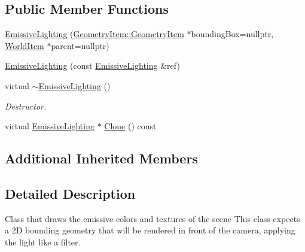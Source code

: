 \subsection*{Public Member Functions}
\begin{DoxyCompactItemize}
\item 
\mbox{\hyperlink{class_geometry_engine_1_1_geometry_world_item_1_1_geometry_light_1_1_emissive_lighting_a50dbde1e7a06662e05bd9732b040b845}{Emissive\+Lighting}} (\mbox{\hyperlink{class_geometry_engine_1_1_geometry_world_item_1_1_geometry_item_1_1_geometry_item}{Geometry\+Item\+::\+Geometry\+Item}} $\ast$bounding\+Box=nullptr, \mbox{\hyperlink{class_geometry_engine_1_1_geometry_world_item_1_1_world_item}{World\+Item}} $\ast$parent=nullptr)
\item 
\mbox{\hyperlink{class_geometry_engine_1_1_geometry_world_item_1_1_geometry_light_1_1_emissive_lighting_aac76201e50ff6a2a62ec84225c7bffaa}{Emissive\+Lighting}} (const \mbox{\hyperlink{class_geometry_engine_1_1_geometry_world_item_1_1_geometry_light_1_1_emissive_lighting}{Emissive\+Lighting}} \&ref)
\item 
\mbox{\label{class_geometry_engine_1_1_geometry_world_item_1_1_geometry_light_1_1_emissive_lighting_a91b7faede57c7eb04237b5296ef33db9}} 
virtual \mbox{\hyperlink{class_geometry_engine_1_1_geometry_world_item_1_1_geometry_light_1_1_emissive_lighting_a91b7faede57c7eb04237b5296ef33db9}{$\sim$\+Emissive\+Lighting}} ()
\begin{DoxyCompactList}\small\item\em Destructor. \end{DoxyCompactList}\item 
virtual \mbox{\hyperlink{class_geometry_engine_1_1_geometry_world_item_1_1_geometry_light_1_1_emissive_lighting}{Emissive\+Lighting}} $\ast$ \mbox{\hyperlink{class_geometry_engine_1_1_geometry_world_item_1_1_geometry_light_1_1_emissive_lighting_ac7e3e90cadf700764fccdacc94238bac}{Clone}} () const
\end{DoxyCompactItemize}
\subsection*{Additional Inherited Members}


\subsection{Detailed Description}
Class that draws the emissive colors and textures of the scene This class expects a 2D bounding geometry that will be rendered in front of the camera, applying the light like a filter. 

